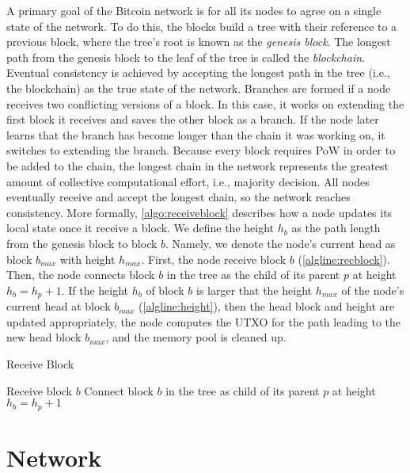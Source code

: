 \documentclass{article}
\begin{document}
A primary goal of the Bitcoin network is for all its nodes to agree on a single
state of the network. To do this, the blocks build a tree with their reference
to a previous block, where the tree's root is known as the \emph{genesis block}.
The longest path from the genesis block to the leaf of the tree is called the
\emph{blockchain}. Eventual consistency is achieved by accepting the longest
path in the tree (i.e., the blockchain) as the true state of the network.
Branches are formed if a node receives two conflicting versions of a block. In
this case, it works on extending the first block it receives and saves the other
block as a branch. If the node later learns that the branch has become longer
than the chain it was working on, it switches to extending the branch. Because
every block requires PoW in order to be added to the chain, the longest chain in
the network represents the greatest amount of collective computational effort,
i.e., majority decision. All nodes eventually receive and accept the longest
chain, so the network reaches consistency. More formally,
\cref{algo:receiveblock} describes how a node updates its local state once it
receive a block. We define the height $h_b$ as the path length from the genesis
block to block $b$. Namely, we denote the node's current head as block $b_{max}$
with height $h_{max}$. First, the node receive block $b$
(\cref{algline:recblock}). Then, the node connects block $b$ in the tree as the
child of its parent $p$ at height $h_b = h_p + 1$. If the height $h_b$ of block
$b$ is larger that the height $h_{max}$ of the node's current head at block
$b_{max}$ (\cref{algline:height}), then the head block and height are updated
appropriately, the node computes the UTXO for the path leading to the new head
block $b_{max}$, and the memory pool is cleaned up.

\begin{algorithm}
  \caption{Receive Block}\label{algo:receiveblock}
  \DontPrintSemicolon%


  Receive block $b$\;\label{algline:recblock}
  Connect block $b$ in the tree as child of its parent $p$ at height $h_b = h_p +
  1$\;
\end{algorithm}

\section{Network}
\end{document}
